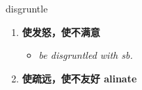 
\begin{frame}
{\huge disgruntle}
\begin{center}
\begin{enumerate}\Large
  \item \textbf{使发怒，使不满意}
  \begin{itemize}
    \item \em{\Large{be disgruntled with sb.}}
  \end{itemize}
  \item \textbf{使疏远，使不友好 alinate}
\end{enumerate}
\end{center}
\end{frame}
